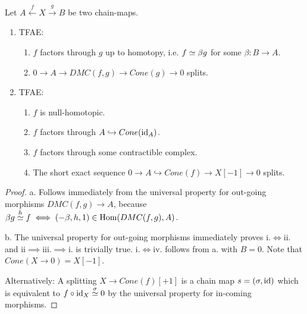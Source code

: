 \documentclass[fontsize=11pt,fleqn,a4paper]{scrartcl}
\begin{document}
\begin{theorem}
Let $A\xleftarrow{f}X\xrightarrow{g} B$ be two chain-maps.
\begin{enumerate}
\item TFAE:
\begin{enumerate}
\item $f$ factors through $g$ up to homotopy, i.e. $f \homotopic \beta g$ for some $\beta:B\to A$.
\item $0 \to A \to DMC(f,g) \to Cone(g) \to 0$ splits.
\end{enumerate}

\item TFAE:
\begin{enumerate}
\item $f$ is null-homotopic.
\item $f$ factors through $A\hookrightarrow Cone(\id_A)$.
\item $f$ factors through some contractible complex.
\item The short exact sequence $0\to A\hookrightarrow Cone(f)\to X[-1]\to 0$ splits.
\end{enumerate}

\end{enumerate}
\end{theorem}
\begin{proof}
a. Follows immediately from the universal property for out-going morphisms $DMC(f,g)\to A$, because $\beta g \homotopic[h] f \iff (-\beta,h,1) \in \Hom(DMC(f,g),A)$.

\medbreak
b. The universal property for out-going morphisms immediately proves i.$\iff$ii. and ii$\implies$iii.$\implies$i. is trivially true. i.$\iff$iv. follows from a. with $B=0$. Note that $Cone(X\to 0)=X[-1]$. 

Alternatively: A splitting $X\to Cone(f)[+1]$ is a chain map $s=(\sigma,\id)$ which is equivalent to $f\circ\id_X \homotopic[\sigma] 0$ by the universal property for in-coming morphisms.
\end{proof}
\end{document}

